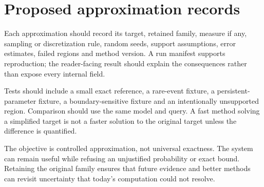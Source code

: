 \section{Proposed approximation records}
Each approximation should record its target, retained family, measure if any, sampling or discretization rule, random seeds, support assumptions, error estimates, failed regions and method version. A run manifest supports reproduction; the reader-facing result should explain the consequences rather than expose every internal field.

Tests should include a small exact reference, a rare-event fixture, a persistent-parameter fixture, a boundary-sensitive fixture and an intentionally unsupported region. Comparison should use the same model and query. A fast method solving a simplified target is not a faster solution to the original target unless the difference is quantified.

The objective is controlled approximation, not universal exactness. The system can remain useful while refusing an unjustified probability or exact bound. Retaining the original family ensures that future evidence and better methods can revisit uncertainty that today's computation could not resolve.
